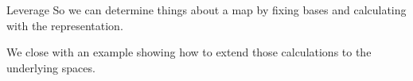\begin{frame}{Leverage}
So
we can determine things about a map by fixing bases and 
calculating with the representation.

We close with an example showing how to extend those calculations
to the underlying spaces.


\end{frame}


